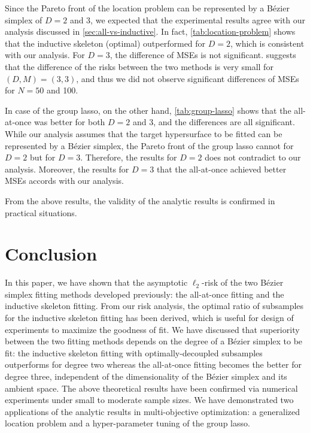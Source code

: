 \documentclass{article}
\begin{document}
Since the Pareto front of the location problem can be represented by a B\'ezier simplex of $D = 2$ and 3, we expected that the experimental results agree with our analysis discussed in \cref{sec:all-vs-inductive}.
In fact, \cref{tab:location-problem} shows that the inductive skeleton (optimal) outperformed for $D = 2$, which is consistent with our analysis.
For $D = 3$, the difference of MSEs is not significant.
 suggests that the difference of the risks between the two methods is very small for $(D, M) = (3, 3)$, and thus we did not observe significant differences of MSEs for $N = 50$ and 100.


In case of the group lasso, on the other hand, \cref{tab:group-lasso} shows that the all-at-once was better for both $D = 2$ and 3, and the differences are all significant.
While our analysis assumes that the target hypersurface to be fitted can be represented by a B\'ezier simplex, the Pareto front of the group lasso cannot for $D = 2$ but for $D = 3$.
Therefore, the results for $D = 2$ does not contradict to our analysis.
Moreover, the results for $D = 3$ that the all-at-once achieved better MSEs accords with our analysis.


From the above results, the validity of the analytic results is confirmed in practical situations.

\section{Conclusion}\label{sec:conclusion}
In this paper, we have shown that the asymptotic $\ell_2$-risk of the two B\'ezier simplex fitting methods developed previously: the all-at-once fitting and the inductive skeleton fitting.
From our risk analysis, the optimal ratio of subsamples for the inductive skeleton fitting has been derived, which is useful for design of experiments to maximize the goodness of fit.
We have discussed that superiority between the two fitting methods depends on the degree of a B\'ezier simplex to be fit: the inductive skeleton fitting with optimally-decoupled subsamples outperforms for degree two whereas the all-at-once fitting becomes the better for degree three, independent of the dimensionality of the B\'ezier simplex and its ambient space.
The above theoretical results have been confirmed via numerical experiments under small to moderate sample sizes.
We have demonstrated two applications of the analytic results in multi-objective optimization: a generalized location problem and a hyper-parameter tuning of the group lasso.
\end{document}
